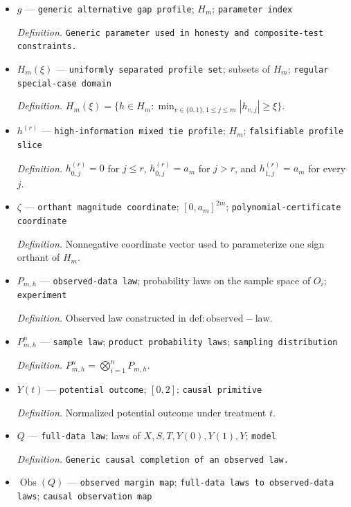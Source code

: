 \documentclass{article}
\begin{document}
\begin{itemize}
  \par\smallskip\noindent\emph{Definition.} \(H_m=[-a_m,a_m]^{2m}\).
  \item \(g\) --- \texttt{generic alternative gap profile}; \(H_m\); \texttt{parameter index}
  \par\smallskip\noindent\emph{Definition.} \texttt{Generic parameter used in honesty and composite-\allowbreak{}test constraints.}
  \item \(H_m(\xi)\) --- \texttt{uniformly separated profile set}; subsets of \(H_m\); \texttt{regular special-\allowbreak{}case domain}
  \par\smallskip\noindent\emph{Definition.} \(H_m(\xi)=\{h\in H_m:\min_{v\in\{0,1\},1\le j\le m}|h_{v,j}|\ge\xi\}\).
  \item \(h^{(r)}\) --- \texttt{high-\allowbreak{}information mixed tie profile}; \(H_m\); \texttt{falsifiable profile slice}
  \par\smallskip\noindent\emph{Definition.} \(h^{(r)}_{0,j}=0\) for \(j\le r\), \(h^{(r)}_{0,j}=a_m\) for \(j>r\), and \(h^{(r)}_{1,j}=a_m\) for every \(j\).
  \item \(\zeta\) --- \texttt{orthant magnitude coordinate}; \([0,a_m]^{2m}\); \texttt{polynomial-\allowbreak{}certificate coordinate}
  \par\smallskip\noindent\emph{Definition.} Nonnegative coordinate vector used to parameterize one sign orthant of \(H_m\).
  \item \(P_{m,h}\) --- \texttt{observed-\allowbreak{}data law}; probability laws on the sample space of \(O_i\); \texttt{experiment}
  \par\smallskip\noindent\emph{Definition.} Observed law constructed in \(\mathrm{def:observed-law}\).
  \item \(P_{m,h}^{n}\) --- \texttt{sample law}; \texttt{product probability laws}; \texttt{sampling distribution}
  \par\smallskip\noindent\emph{Definition.} \(P_{m,h}^{n}=\bigotimes_{i=1}^{n}P_{m,h}\).
  \item \(Y(t)\) --- \texttt{potential outcome}; \([0,2]\); \texttt{causal primitive}
  \par\smallskip\noindent\emph{Definition.} Normalized potential outcome under treatment \(t\).
  \item \(Q\) --- \texttt{full-\allowbreak{}data law}; laws of \(X,S,T,Y(0),Y(1),Y\); \texttt{model}
  \par\smallskip\noindent\emph{Definition.} \texttt{Generic causal completion of an observed law.}
  \item \(\operatorname{Obs}(Q)\) --- \texttt{observed margin map}; \texttt{full-\allowbreak{}data laws to observed-\allowbreak{}data laws}; \texttt{causal observation map}

\end{itemize}
\end{document}
